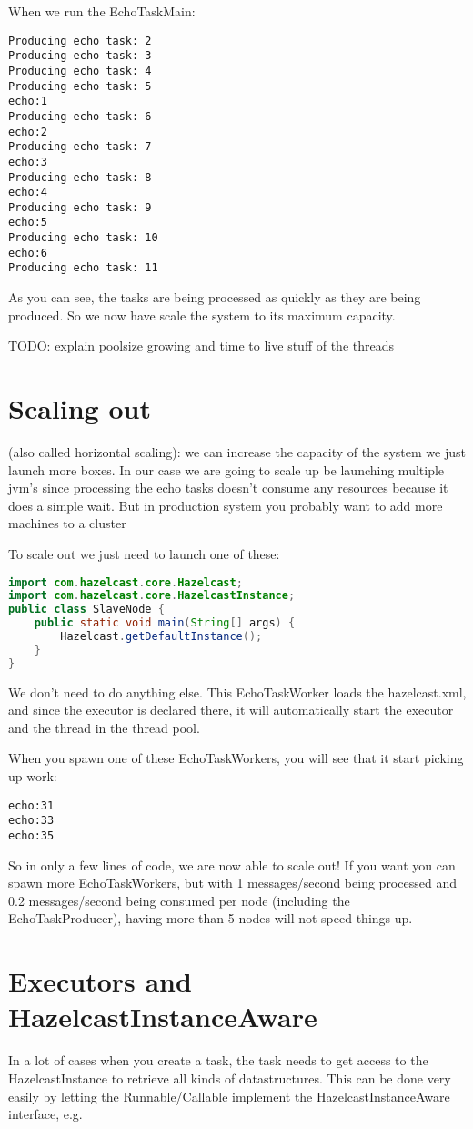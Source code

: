 When we run the EchoTaskMain:
\begin{verbatim}
Producing echo task: 2
Producing echo task: 3
Producing echo task: 4
Producing echo task: 5
echo:1
Producing echo task: 6
echo:2
Producing echo task: 7
echo:3
Producing echo task: 8
echo:4
Producing echo task: 9
echo:5
Producing echo task: 10
echo:6
Producing echo task: 11	
\end{verbatim}
As you can see, the tasks are being processed as quickly as they are being produced. So we now have scale the system to its maximum capacity.

TODO: explain poolsize growing and time to live stuff of the threads

\section{Scaling out}
(also called horizontal scaling): we can increase the capacity of the system we just launch more boxes. In our case we are going to scale up be launching multiple jvm's since processing the echo tasks doesn't consume any resources because it does a simple wait. But in production system you probably want to add more machines to a cluster

To scale out we just need to launch one of these:

\begin{lstlisting}[language=java]
import com.hazelcast.core.Hazelcast;
import com.hazelcast.core.HazelcastInstance;
public class SlaveNode {
    public static void main(String[] args) {
        Hazelcast.getDefaultInstance();
    }
}
\end{lstlisting}
We don't need to do anything else. This EchoTaskWorker loads the hazelcast.xml, and since the executor is declared there, it will automatically start the executor and the thread in the thread pool. 

When you spawn one of these EchoTaskWorkers, you will see that it start picking up work:
\begin{verbatim}
echo:31
echo:33
echo:35	
\end{verbatim}
So in only a few lines of code, we are now able to scale out! If you want you can spawn more EchoTaskWorkers, but with 1 messages/second being processed and 0.2 messages/second being consumed per node (including the EchoTaskProducer), having more than 5 nodes will not speed things up.

\section{Executors and HazelcastInstanceAware}
In a lot of cases when you create a task, the task needs to get access to the HazelcastInstance to retrieve all kinds of datastructures. This can be done very easily by letting the Runnable/Callable implement the HazelcastInstanceAware interface, e.g.

